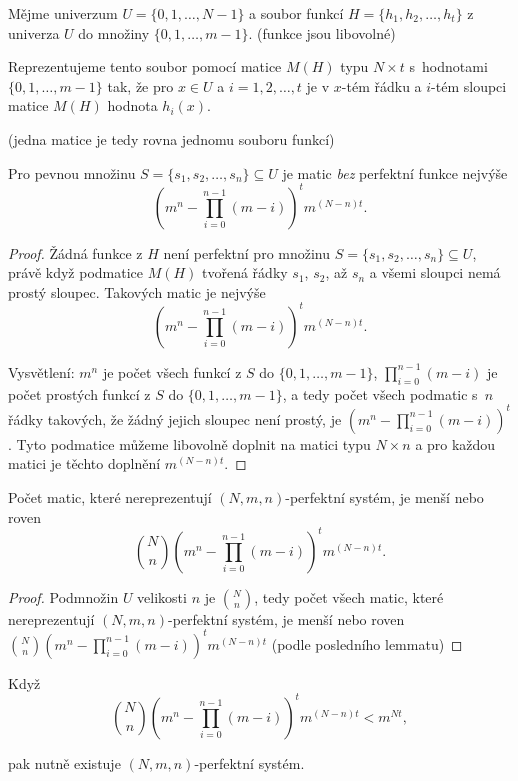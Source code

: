 \documentclass[a4paper,12pt]{article}
\begin{document}
Mějme univerzum $U=\{0,1,\dots,N-1\}$ a soubor 
funkcí $H=\{h_1,h_2,\dots,h_t\}$ z univerza $U$ do množiny 
$\{0,1,\dots,m-1\}$. (funkce jsou libovolné)

\begin{definice}
    Reprezentujeme tento soubor pomocí 
matice $M(H)$ typu $N\times t$ s~hodnotami $\{0,1,\dots,m-1\}$ tak, 
že pro $x\in U$ a $i=1,2,\dots,t$ je 
v $x$-tém řádku a $i$-tém sloupci matice $M(H)$ 
hodnota $h_i(x)$.
\end{definice}

(jedna matice je tedy rovna jednomu souboru funkcí)

\begin{lemma}
    Pro pevnou množinu $S=\{s_1,s_2,\dots,s_n\}\subseteq U$ je matic \emph{bez} perfektní funkce nejvýše $$(m^n-\prod_{i=0}^{n-1}(m-i))^tm^{(N-n)t}.$$
\end{lemma}

\begin{proof}
    Žádná funkce z $H$ 
    není perfektní pro množinu $S=\{s_1,s_2,\dots,s_n\}\subseteq 
    U$, 
    právě když podmatice $M(H)$ tvoře\-ná 
    řádky $s_1$, $s_2$, až $s_n$ a všemi sloupci nemá prostý sloupec. 
    Ta\-ko\-vých matic je nejvýše 
    $$(m^n-\prod_{i=0}^{n-1}(m-i))^tm^{(N-n)t}.$$ 
    
    Vysvětlení:  $m^n$ je počet všech funkcí z $
    S$ do 
    $\{0,1,\dots,m-1\}$, $\prod_{i=0}^{n-1}(m-i)$ je počet prostých funkcí z $
    S$ 
    do $\{0,1,\dots,m-1\}$, a tedy počet všech podmatic s~$n$ 
    řádky takových, že žádný jejich sloupec není prostý, je 
    $(m^n-\prod_{i=0}^{n-1}(m-i))^t$.  Tyto podmatice můžeme 
    libovolně doplnit na matici typu $N\times n$ a pro každou 
    matici je těchto doplnění $m^{(N-n)t}$.
\end{proof}

\begin{lemma}
    Počet matic, které nereprezentují $(N,m,n)$-perfektní systém, je 
    menší nebo roven  
    $$\binom Nn(m^n-\prod_{i=0}^{n-1}(m-i))^tm^{(N-n)t}.$$
\end{lemma}

\begin{proof}
Podmnožin $U$ velikosti $n$ je $\binom Nn$, tedy počet všech 
matic, které nereprezentují $(N,m,n)$-perfektní systém, je 
menší nebo roven  
$\binom Nn(m^n-\prod_{i=0}^{n-1}(m-i))^tm^{(N-n)t}$ (podle posledního lemmatu)
\end{proof}

\begin{lemma}
    Když 
    $$\binom Nn(m^n-\prod_{i=0}^{n-1}(m-i))^tm^{(N-n)t}<m^{Nt},$$

    pak nutně existuje $(N,m,n)$-perfektní systém.
\end{lemma}
\end{document}
